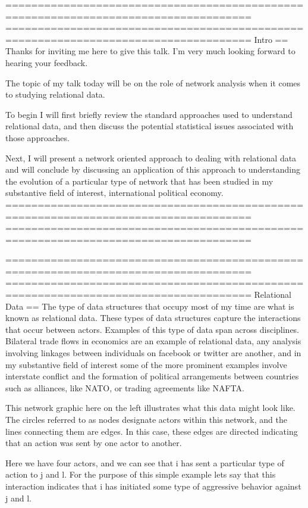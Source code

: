 ====================================================================================
====================================================================================
Intro
==
Thanks for inviting me here to give this talk. I'm very much looking forward to hearing your feedback. 

The topic of my talk today will be on the role of network analysis when it comes to studying relational data. 

To begin I will first briefly review the standard approaches used to understand relational data, and then discuss the potential statistical issues associated with those approaches.

Next, I will present a network oriented approach to dealing with relational data and will conclude by discussing an application of this approach to understanding the evolution of a particular type of network that has been studied in my substantive field of interest, international political economy. 
====================================================================================
====================================================================================

====================================================================================
====================================================================================
Relational Data
==
The type of data structures that occupy most of my time are what is known as relational data. These types of data structures capture the interactions that occur between actors. Examples of this type of data span across disciplines. Bilateral trade flows in economics are an example of relational data, any analysis involving linkages between individuals on facebook or twitter are another, and in my substantive field of interest some of the more prominent examples involve interstate conflict and the formation of political arrangements between countries such as alliances, like NATO, or trading agreements like NAFTA.

This network graphic here on the left illustrates what this data might look like. The circles referred to as nodes designate actors within this network, and the lines connecting them are edges. In this case, these edges are directed indicating that an action was sent by one actor to another. 

Here we have four actors, and we can see that i has sent a particular type of action to j and l. For the purpose of this simple example lets say that this interaction indicates that i has initiated some type of aggressive behavior against j and l. 


